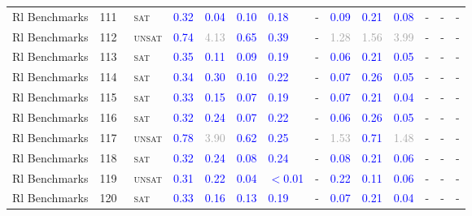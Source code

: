 \begin{center}
{\begin{longtable}{@{}llllllllllllll@{}}
Rl Benchmarks & 111 & ~\textsc{sat} & \textcolor{blue}{0.32} & \textcolor{blue}{0.04} & \textcolor{blue}{0.10} & \textcolor{blue}{0.18} & - & \textcolor{blue}{0.09} & \textcolor{blue}{0.21} & \textcolor{blue}{0.08} & - & - & - \\
Rl Benchmarks & 112 & ~\textsc{unsat} & \textcolor{blue}{0.74} & \textcolor{darkgray}{4.13} & \textcolor{blue}{0.65} & \textcolor{blue}{0.39} & - & \textcolor{darkgray}{1.28} & \textcolor{darkgray}{1.56} & \textcolor{darkgray}{3.99} & - & - & - \\
Rl Benchmarks & 113 & ~\textsc{sat} & \textcolor{blue}{0.35} & \textcolor{blue}{0.11} & \textcolor{blue}{0.09} & \textcolor{blue}{0.19} & - & \textcolor{blue}{0.06} & \textcolor{blue}{0.21} & \textcolor{blue}{0.05} & - & - & - \\
Rl Benchmarks & 114 & ~\textsc{sat} & \textcolor{blue}{0.34} & \textcolor{blue}{0.30} & \textcolor{blue}{0.10} & \textcolor{blue}{0.22} & - & \textcolor{blue}{0.07} & \textcolor{blue}{0.26} & \textcolor{blue}{0.05} & - & - & - \\
Rl Benchmarks & 115 & ~\textsc{sat} & \textcolor{blue}{0.33} & \textcolor{blue}{0.15} & \textcolor{blue}{0.07} & \textcolor{blue}{0.19} & - & \textcolor{blue}{0.07} & \textcolor{blue}{0.21} & \textcolor{blue}{0.04} & - & - & - \\
Rl Benchmarks & 116 & ~\textsc{sat} & \textcolor{blue}{0.32} & \textcolor{blue}{0.24} & \textcolor{blue}{0.07} & \textcolor{blue}{0.22} & - & \textcolor{blue}{0.06} & \textcolor{blue}{0.26} & \textcolor{blue}{0.05} & - & - & - \\
Rl Benchmarks & 117 & ~\textsc{unsat} & \textcolor{blue}{0.78} & \textcolor{darkgray}{3.90} & \textcolor{blue}{0.62} & \textcolor{blue}{0.25} & - & \textcolor{darkgray}{1.53} & \textcolor{blue}{0.71} & \textcolor{darkgray}{1.48} & - & - & - \\
Rl Benchmarks & 118 & ~\textsc{sat} & \textcolor{blue}{0.32} & \textcolor{blue}{0.24} & \textcolor{blue}{0.08} & \textcolor{blue}{0.24} & - & \textcolor{blue}{0.08} & \textcolor{blue}{0.21} & \textcolor{blue}{0.06} & - & - & - \\
Rl Benchmarks & 119 & ~\textsc{unsat} & \textcolor{blue}{0.31} & \textcolor{blue}{0.22} & \textcolor{blue}{0.04} & \textcolor{blue}{$<$0.01} & - & \textcolor{blue}{0.22} & \textcolor{blue}{0.11} & \textcolor{blue}{0.06} & - & - & - \\
Rl Benchmarks & 120 & ~\textsc{sat} & \textcolor{blue}{0.33} & \textcolor{blue}{0.16} & \textcolor{blue}{0.13} & \textcolor{blue}{0.19} & - & \textcolor{blue}{0.07} & \textcolor{blue}{0.21} & \textcolor{blue}{0.04} & - & - & - \\

\end{longtable}}
\end{center}

